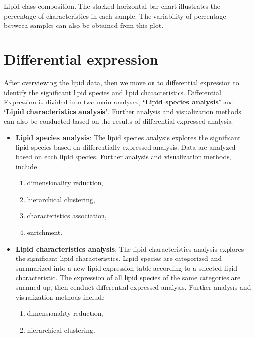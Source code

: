 \documentclass[]{article}
\providecommand{\tightlist}{%
  \setlength{\itemsep}{0pt}\setlength{\parskip}{0pt}}
\newcommand{\hlcom}[1]{\textcolor[rgb]{0.502,0.502,0.502}{\textit{#1}}}%
\newcommand{\hlopt}[1]{\textcolor[rgb]{0,0,0}{#1}}%
\newcommand{\hlstd}[1]{\textcolor[rgb]{0.251,0.251,0.251}{#1}}%
\newenvironment{Shaded}{\begin{myshaded}}{\end{myshaded}}
\newcommand{\CommentTok}[1]{\hlcom{#1}}
\newcommand{\OperatorTok}[1]{\hlopt{#1}}
\newcommand{\NormalTok}[1]{\hlstd{#1}}
\begin{document}
\begin{Shaded}
\end{Shaded}

\label{fig:unnamed-chunk-16}Lipid class composition. The stacked horizontal bar chart illustrates the percentage of characteristics in each sample. The variability of percentage between samples can also be obtained from this plot.

\hypertarget{DE}{%
\section{Differential expression}\label{DE}}

After overviewing the lipid data, then we move on to differential expression to identify the significant lipid species and lipid characteristics. Differential Expression is divided into two main analyses, \textbf{`Lipid species analysis'} and \textbf{`Lipid characteristics analysis'}. Further analysis and visualization methods can also be conducted based on the results of differential expressed analysis.

\begin{itemize}
\item
  \textbf{Lipid species analysis}: The lipid species analysis explores the significant lipid species based on differentially expressed analysis. Data are analyzed based on each lipid species. Further analysis and visualization methods, include

  \begin{enumerate}
  \def\labelenumi{\arabic{enumi}.}
  \tightlist
  \item
    dimensionality reduction,
  \item
    hierarchical clustering,
  \item
    characteristics association,
  \item
    enrichment.
  \end{enumerate}
\item
  \textbf{Lipid characteristics analysis}: The lipid characteristics analysis explores the significant lipid characteristics. Lipid species are categorized and summarized into a new lipid expression table according to a selected lipid characteristic. The expression of all lipid species of the same categories are summed up, then conduct differential expressed analysis. Further analysis and visualization methods include

  \begin{enumerate}
  \def\labelenumi{\arabic{enumi}.}
  \tightlist
  \item
    dimensionality reduction,
  \item
    hierarchical clustering.
  \end{enumerate}
\end{itemize}
\end{document}
